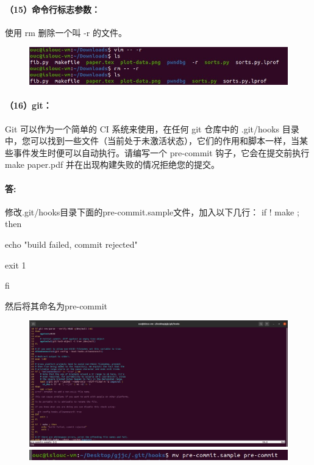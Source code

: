 \documentclass[a4paper, 12pt]{article}
\begin{document}
	\paragraph{（15）命令行标志参数：}
	使用 rm 删除一个叫 -r 的文件。
	
	\begin{figure}[H]
		\centering
		\includegraphics[width=1\textwidth]{029.jpg}
	\end{figure}
	
	\paragraph{（16）git：}
	Git 可以作为一个简单的 CI 系统来使用，在任何 git 仓库中的 .git/hooks 目录中，您可以找到一些文件（当前处于未激活状态），它们的作用和脚本一样，当某些事件发生时便可以自动执行。请编写一个 pre-commit 钩子，它会在提交前执行 make paper.pdf 并在出现构建失败的情况拒绝您的提交。
	
	\paragraph{答:}
	修改.git/hooks目录下面的pre-commit.sample文件，加入以下几行：
	if  ! make ; then
	
	echo "build failed, commit rejected"
	
	exit 1
	
	fi
	
	然后将其命名为pre-commit
	
	\begin{figure}[H]
		\centering
		\includegraphics[width=1\textwidth]{034.jpg}
		\includegraphics[width=1\textwidth]{035.jpg}
	\end{figure}
	
\end{document}

